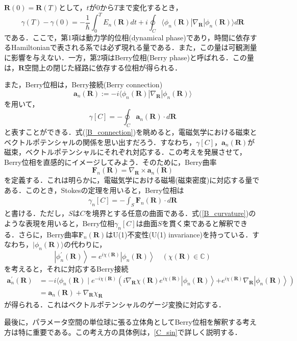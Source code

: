 $\bm{R}(0) = \bm{R}(T)$として，$t$が$0$から$T$まで変化するとき，
\begin{equation}
  \gamma(T) - \gamma(0) = -\frac{1}{\hbar} \int_0^T E_n(\bm{R}) dt + i \oint_C \langle \phi_n(\bm{R}) | \nabla_{\bm{R}} | \phi_n(\bm{R}) \rangle d\bm{R}
\end{equation}
である．ここで，第1項は動力学的位相(dynamical phase)であり，時間に依存するHamiltonianで表される系では必ず現れる量である．また，この量は可観測量に影響を与えない．一方，第2項はBerry位相(Berry phase)と呼ばれる．この量は，$\bm{R}$空間上の閉じた経路に依存する位相が得られる．


また，Berry位相は，Berry接続(Berry connection)
\begin{equation}
  \bm{a}_n(\bm{R}) := -i \langle \phi_n(\bm{R}) | \nabla_{\bm{R}} | \phi_n(\bm{R}) \rangle
\end{equation}
を用いて，
\begin{equation}
  \gamma[C] = - \oint_C \bm{a}_n(\bm{R}) \cdot d\bm{R} \label{B_connection}
\end{equation}
と表すことができる．式(\ref{B_connection})を眺めると，電磁気学における磁束とベクトルポテンシャルの関係を思い出すだろう．すなわち，$\gamma[C]$，$\bm{a}_n(\bm{R})$が磁束，ベクトルポテンシャルにそれぞれ対応する．この考えを発展させて，Berry位相を直感的にイメージしてみよう．そのために，Berry曲率
\begin{equation}
  \bm{F}_n(\bm{R}) = \nabla_{\bm{R}} \times \bm{a}_n(\bm{R})
\end{equation}
を定義する．これは明らかに，電磁気学における磁場(磁束密度)に対応する量である．このとき，Stokesの定理を用いると，Berry位相は
\begin{align}
  \gamma_n[C] = - \int_S \bm{F}_n(\bm{R}) \cdot d\bm{R} \label{B_curvature}
\end{align}
と書ける．ただし，$S$は$C$を境界とする任意の曲面である．式(\ref{B_curvature})のような表現を用いると，Berry位相$\gamma_n[C]$は曲面$S$を貫く束であると解釈できる．さらに，Berry曲率$\bm{F}_n(\bm{R})$はU(1)不変性(U(1) invariance)を持っている．すなわち，$|\phi_n(\bm{R}) \rangle$の代わりに，
\begin{equation}
  \left|\phi_n^{\prime}(\bm{R})\right\rangle=e^{i \chi(\bm{R})}\left|\phi_n(\bm{R})\right\rangle \quad (\chi(\bm{R}) \in \mathbb{C})
\end{equation}
を考えると，それに対応するBerry接続
\begin{align}
  \bm{a}_n^{\prime}(\bm{R})
  &= -i\langle \phi_n(\bm{R}) \mid e^{-i\chi(\bm{R})}\left(i \nabla_{\bm{R}} \chi(\bm{R}) e^{i \chi(\bm{R})}\left|\phi_n(\bm{R})\right\rangle\right. \left.+e^{i \chi(\bm{R})} \nabla_{\bm{R}}\left|\phi_n(\bm{R})\right\rangle\right)\\
  &= \bm{a}_n(\bm{R})+  \nabla_{\bm{R}} \chi_{\bm{R}}
\end{align}
が得られる．これはベクトルポテンシャルのゲージ変換に対応する．


最後に，パラメータ空間の単位球に張る立体角としてBerry位相を解釈する考え方は特に重要である。この考え方の具体例は，\ref{C_sin}で詳しく説明する．